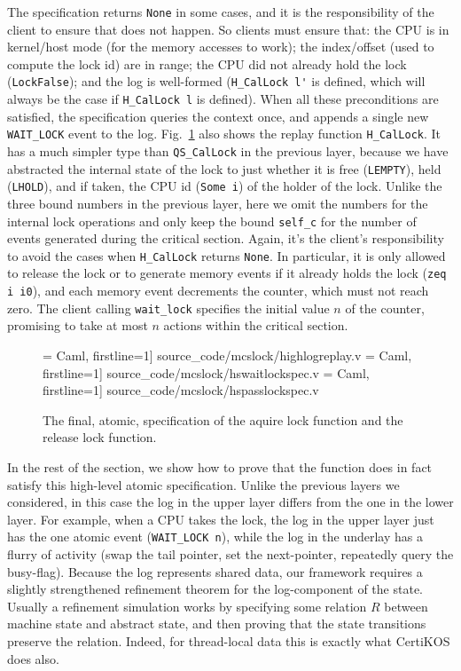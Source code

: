 The specification returns \lstinline$None$ in some
cases, and it is the
responsibility of the client to ensure  that does not
happen. So clients must ensure that: the CPU is in kernel/host
mode (for the memory accesses to work); the index/offset (used to
compute the lock id) are in range; the CPU did not already hold the
lock (\lstinline$LockFalse$); and the log is well-formed
(\lstinline$H_CalLock l'$ is defined, which will always be the case if
\lstinline$H_CalLock l$ is defined).  When all these preconditions are
satisfied, the specification queries the context once, and appends a
single new \lstinline$WAIT_LOCK$ event to the log.
Fig.~\ref{fig:hswaitlockspec} also shows the replay function
\lstinline$H_CalLock$.
It has a much simpler type than \lstinline$QS_CalLock$ in the
previous layer, because we have abstracted the internal state of the lock
to just whether it is free (\lstinline$LEMPTY$),
held (\lstinline$LHOLD$), and if taken, the CPU id (\lstinline$Some i$)
of the holder of the lock. Unlike the three bound numbers in the
previous layer, here we omit the numbers for the internal lock
operations and only keep the bound \lstinline$self_c$ for the number
of events generated during the critical section. Again, it's the
client's responsibility to avoid the cases when \lstinline$H_CalLock$
returns \lstinline$None$. In particular, it is only allowed to release
the lock or to generate memory events if it already holds the lock
(\lstinline$zeq i i0$), and each memory event decrements the counter,
which must not reach zero. The client calling \lstinline$wait_lock$
specifies the initial value $n$ of the counter, promising to take at
most $n$ actions within the critical section.


\begin{figure}
 = Caml, firstline=1] {source_code/mcslock/highlogreplay.v}
 = Caml, firstline=1] {source_code/mcslock/hswaitlockspec.v}
 = Caml, firstline=1] {source_code/mcslock/hspasslockspec.v}
\caption{The final, atomic, specification of the aquire lock function and the release lock function.}
\label{fig:hswaitlockspec}
\end{figure}


In the rest of the section, we show how to prove that the function
does in fact satisfy this high-level atomic specification.
Unlike the previous layers we considered, in this case the log in the
upper layer differs from the one in the lower layer. For example, when
a CPU takes the lock, the log in the upper layer just has the one
atomic event (\lstinline$WAIT_LOCK n$), while the log in the underlay
has a flurry of activity (swap the tail pointer, set the next-pointer,
repeatedly query the busy-flag).
Because the log represents shared data, our framework requires a
slightly strengthened refinement theorem for the log-component of the
state. Usually a refinement simulation works by specifying some
relation $R$ between machine state and abstract state, and then
proving that the state transitions preserve the relation. Indeed, for
thread-local data this is exactly what CertiKOS does also.

